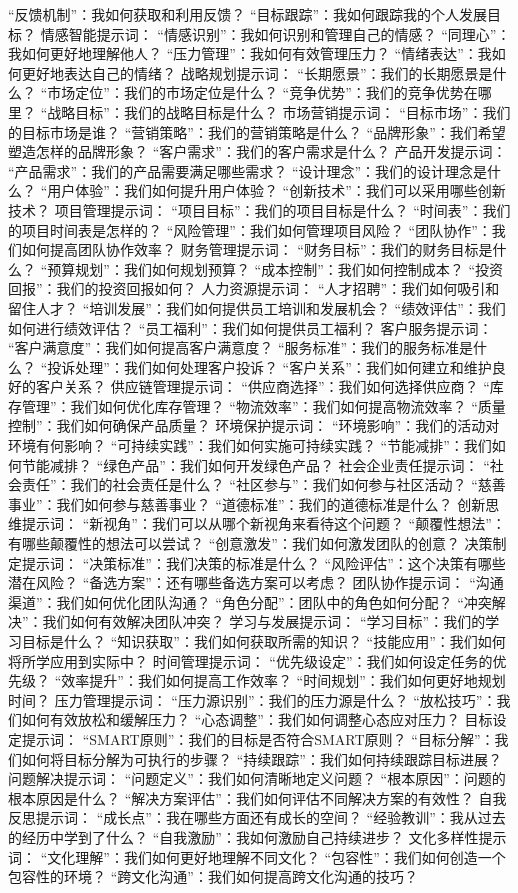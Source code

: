 \documentclass[12pt]{book}
\begin{document}
“反馈机制”：我如何获取和利用反馈？
“目标跟踪”：我如何跟踪我的个人发展目标？
情感智能提示词：
“情感识别”：我如何识别和管理自己的情感？
“同理心”：我如何更好地理解他人？
“压力管理”：我如何有效管理压力？
“情绪表达”：我如何更好地表达自己的情绪？
战略规划提示词：
“长期愿景”：我们的长期愿景是什么？
“市场定位”：我们的市场定位是什么？
“竞争优势”：我们的竞争优势在哪里？
“战略目标”：我们的战略目标是什么？
市场营销提示词：
“目标市场”：我们的目标市场是谁？
“营销策略”：我们的营销策略是什么？
“品牌形象”：我们希望塑造怎样的品牌形象？
“客户需求”：我们的客户需求是什么？
产品开发提示词：
“产品需求”：我们的产品需要满足哪些需求？
“设计理念”：我们的设计理念是什么？
“用户体验”：我们如何提升用户体验？
“创新技术”：我们可以采用哪些创新技术？
项目管理提示词：
“项目目标”：我们的项目目标是什么？
“时间表”：我们的项目时间表是怎样的？
“风险管理”：我们如何管理项目风险？
“团队协作”：我们如何提高团队协作效率？
财务管理提示词：
“财务目标”：我们的财务目标是什么？
“预算规划”：我们如何规划预算？
“成本控制”：我们如何控制成本？
“投资回报”：我们的投资回报如何？
人力资源提示词：
“人才招聘”：我们如何吸引和留住人才？
“培训发展”：我们如何提供员工培训和发展机会？
“绩效评估”：我们如何进行绩效评估？
“员工福利”：我们如何提供员工福利？
客户服务提示词：
“客户满意度”：我们如何提高客户满意度？
“服务标准”：我们的服务标准是什么？
“投诉处理”：我们如何处理客户投诉？
“客户关系”：我们如何建立和维护良好的客户关系？
供应链管理提示词：
“供应商选择”：我们如何选择供应商？
“库存管理”：我们如何优化库存管理？
“物流效率”：我们如何提高物流效率？
“质量控制”：我们如何确保产品质量？
环境保护提示词：
“环境影响”：我们的活动对环境有何影响？
“可持续实践”：我们如何实施可持续实践？
“节能减排”：我们如何节能减排？
“绿色产品”：我们如何开发绿色产品？
社会企业责任提示词：
“社会责任”：我们的社会责任是什么？
“社区参与”：我们如何参与社区活动？
“慈善事业”：我们如何参与慈善事业？
“道德标准”：我们的道德标准是什么？
创新思维提示词：
“新视角”：我们可以从哪个新视角来看待这个问题？
“颠覆性想法”：有哪些颠覆性的想法可以尝试？
“创意激发”：我们如何激发团队的创意？
决策制定提示词：
“决策标准”：我们决策的标准是什么？
“风险评估”：这个决策有哪些潜在风险？
“备选方案”：还有哪些备选方案可以考虑？
团队协作提示词：
“沟通渠道”：我们如何优化团队沟通？
“角色分配”：团队中的角色如何分配？
“冲突解决”：我们如何有效解决团队冲突？
学习与发展提示词：
“学习目标”：我们的学习目标是什么？
“知识获取”：我们如何获取所需的知识？
“技能应用”：我们如何将所学应用到实际中？
时间管理提示词：
“优先级设定”：我们如何设定任务的优先级？
“效率提升”：我们如何提高工作效率？
“时间规划”：我们如何更好地规划时间？
压力管理提示词：
“压力源识别”：我们的压力源是什么？
“放松技巧”：我们如何有效放松和缓解压力？
“心态调整”：我们如何调整心态应对压力？
目标设定提示词：
“SMART原则”：我们的目标是否符合SMART原则？
“目标分解”：我们如何将目标分解为可执行的步骤？
“持续跟踪”：我们如何持续跟踪目标进展？
问题解决提示词：
“问题定义”：我们如何清晰地定义问题？
“根本原因”：问题的根本原因是什么？
“解决方案评估”：我们如何评估不同解决方案的有效性？
自我反思提示词：
“成长点”：我在哪些方面还有成长的空间？
“经验教训”：我从过去的经历中学到了什么？
“自我激励”：我如何激励自己持续进步？
文化多样性提示词：
“文化理解”：我们如何更好地理解不同文化？
“包容性”：我们如何创造一个包容性的环境？
“跨文化沟通”：我们如何提高跨文化沟通的技巧？
\end{document}
